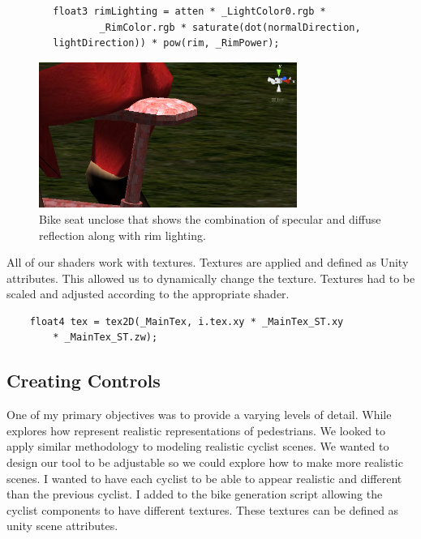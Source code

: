 \documentclass{scrartcl}
\begin{document}
        \begin{lstlisting} 
        float3 rimLighting = atten * _LightColor0.rgb * 
        		_RimColor.rgb * saturate(dot(normalDirection, 
		lightDirection)) * pow(rim, _RimPower);
         \end{lstlisting}	
	\begin{figure}[h]
   	 \centering
   	 \includegraphics[width=0.75\textwidth]{Glow_effect.png}
   	 \caption{Bike seat unclose that shows the combination of specular and diffuse reflection along with rim lighting.}
   	 \label{fig:bike_seat}
	\end{figure}
	
	All of our shaders work with textures.  Textures are applied and defined as Unity attributes.  This allowed us to dynamically change the texture.  Textures had to be 		scaled and adjusted according to the appropriate shader.  
	
        \begin{lstlisting} 
	float4 tex = tex2D(_MainTex, i.tex.xy * _MainTex_ST.xy 
		* _MainTex_ST.zw);
	\end{lstlisting}		
        
	\subsection{Creating Controls} 
		
One of my primary objectives was to provide a varying levels of detail.  While \citep{peters2011crowds} explores how represent realistic representations of pedestrians.  We looked to apply similar methodology to modeling realistic cyclist scenes.  We wanted to design our tool to be adjustable so we could explore how to make more realistic scenes.  I wanted to have each cyclist to be able to appear realistic and different than the previous cyclist.  I added to the bike generation script allowing the cyclist components to have different textures.  These textures can be defined as unity scene attributes.  
\end{document}
